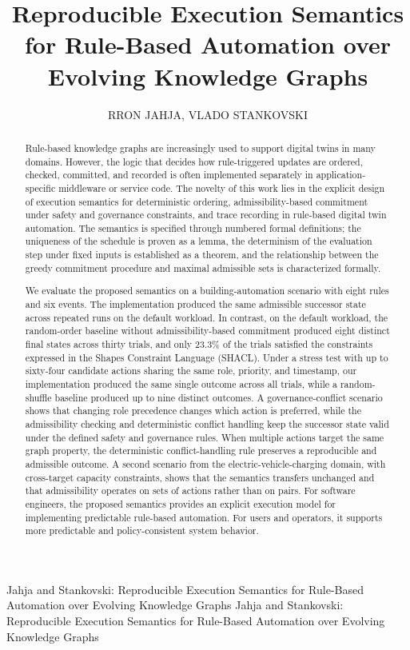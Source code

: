 \documentclass{ieeeaccess}
\theoremstyle{definition}
\theoremstyle{plain}
\theoremstyle{remark}
\begin{document}
\title{Reproducible Execution Semantics for Rule-Based Automation over Evolving Knowledge Graphs}

\author{\uppercase{Rron Jahja},
\uppercase{Vlado Stankovski}}

\address[1]{University of Ljubljana, Faculty of Computer and Information Science, \\ Večna pot 113, 1000 Ljubljana, Slovenia}

\markboth
{Jahja and Stankovski: Reproducible Execution Semantics for Rule-Based Automation over Evolving Knowledge Graphs}
{Jahja and Stankovski: Reproducible Execution Semantics for Rule-Based Automation over Evolving Knowledge Graphs}

\begin{abstract}
Rule-based knowledge graphs are increasingly used to support digital twins in many domains. However, the logic that decides how rule-triggered updates are ordered, checked, committed, and recorded is often implemented separately in application-specific middleware or service code. The novelty of this work lies in the explicit design of execution semantics for deterministic ordering, admissibility-based commitment under safety and governance constraints, and trace recording in rule-based digital twin automation.
The semantics is specified through numbered formal definitions; the uniqueness of the schedule is proven as a lemma, the determinism of the evaluation step under fixed inputs is established as a theorem, and the relationship between the greedy commitment procedure and maximal admissible sets is characterized formally.

We evaluate the proposed semantics on a building-automation scenario with eight rules and six events. The implementation produced the same admissible successor state across repeated runs on the default workload. In contrast, on the default workload, the random-order baseline without admissibility-based commitment produced eight distinct final states across thirty trials, and only 23.3\% of the trials satisfied the constraints expressed in the Shapes Constraint Language (SHACL). Under a stress test with up to sixty-four candidate actions sharing the same role, priority, and timestamp, our implementation produced the same single outcome across all trials, while a random-shuffle baseline produced up to nine distinct outcomes. A governance-conflict scenario shows that changing role precedence changes which action is preferred, while the admissibility checking and deterministic conflict handling keep the successor state valid under the defined safety and governance rules. When multiple actions target the same graph property, the deterministic conflict-handling rule preserves a reproducible and admissible outcome.
A second scenario from the electric-vehicle-charging domain, with cross-target capacity constraints, shows that the semantics transfers unchanged and that admissibility operates on sets of actions rather than on pairs.
For software engineers, the proposed semantics provides an explicit execution model for implementing predictable rule-based automation. For users and operators, it supports more predictable and policy-consistent system behavior.
\end{abstract}
\end{document}
